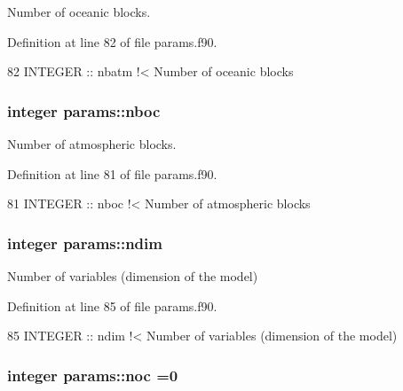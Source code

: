 Number of oceanic blocks. 



Definition at line 82 of file params.\+f90.


\begin{DoxyCode}
82   \textcolor{keywordtype}{INTEGER} :: nbatm\textcolor{comment}{  !< Number of oceanic blocks}
\end{DoxyCode}
\subsubsection[{\texorpdfstring{nboc}{nboc}}]{\setlength{\rightskip}{0pt plus 5cm}integer params\+::nboc}\hypertarget{namespaceparams_a54123b5a947703d21d0c882dec6780ac}{}\label{namespaceparams_a54123b5a947703d21d0c882dec6780ac}


Number of atmospheric blocks. 



Definition at line 81 of file params.\+f90.


\begin{DoxyCode}
81   \textcolor{keywordtype}{INTEGER} :: nboc\textcolor{comment}{   !< Number of atmospheric blocks}
\end{DoxyCode}
\subsubsection[{\texorpdfstring{ndim}{ndim}}]{\setlength{\rightskip}{0pt plus 5cm}integer params\+::ndim}\hypertarget{namespaceparams_a2323fe1773f086e20c14f266351c482b}{}\label{namespaceparams_a2323fe1773f086e20c14f266351c482b}


Number of variables (dimension of the model) 



Definition at line 85 of file params.\+f90.


\begin{DoxyCode}
85   \textcolor{keywordtype}{INTEGER} :: ndim\textcolor{comment}{   !< Number of variables (dimension of the model)}
\end{DoxyCode}
\subsubsection[{\texorpdfstring{noc}{noc}}]{\setlength{\rightskip}{0pt plus 5cm}integer params\+::noc =0}\hypertarget{namespaceparams_acdb6ef89bcada9ba7b6b6bba575b60f4}{}\label{namespaceparams_acdb6ef89bcada9ba7b6b6bba575b60f4}


